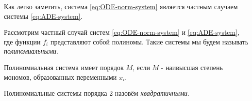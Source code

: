 Как легко заметить, система \eqref{eq:ODE-norm-system} является частным случаем системы \eqref{eq:ADE-system}.



\begin{definition}
    Рассмотрим частный случай систем \eqref{eq:ODE-norm-system} и \eqref{eq:ADE-system}, где функции $f_i$ представляют собой полиномы. Такие системы мы будем называть \textit{полиномиальными}.
\end{definition}

\begin{definition}
    Полиномиальная система имеет порядок $M$, если $M$ - наивысшая степень мономов, образованных переменными $x_i$.
\end{definition}

\begin{definition}
    Полиномиальные системы порядка 2 назовём \textit{квадратичными}.
\end{definition}


